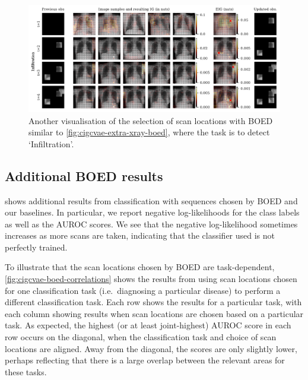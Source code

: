 \begin{figure}[t]
  \centering
  \includegraphics[width=\textwidth]{figs/cigcvae/boed-visualisation-4980-compressed.pdf}
  \caption{Another visualisation of the selection of scan locations with BOED similar to \cref{fig:cigcvae-extra-xray-boed}, where the task is to detect `Infiltration'.}
\label{fig:cigcvae-extra-xray-boed-extra}
\end{figure}

\subsection{Additional BOED results} \label{supp:cigcvae-boed-results}
 shows additional results from classification with
sequences chosen by BOED and our baselines. In particular, we report negative
log-likelihoods for the class labels as well as the AUROC scores. We see that
the negative log-likelihood sometimes increases as more scans are taken,
indicating that the classifier used is not perfectly trained. 

To illustrate that the scan locations chosen by BOED are task-dependent,
\cref{fig:cigcvae-boed-correlations} shows the results from using scan locations chosen
for one classification task (i.e.~diagnosing a particular disease) to perform a
different classification task. Each row shows the results for a particular task,
with each column showing results when scan locations are chosen based on a
particular task. As expected, the highest (or at least joint-highest) AUROC
score in each row occurs on the diagonal, when the classification task and
choice of scan locations are aligned. Away from the diagonal, the scores are
only slightly lower, perhaps reflecting that there is a large overlap between
the relevant areas for these tasks.

